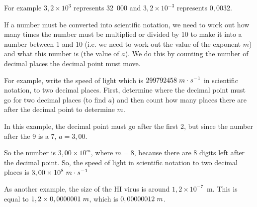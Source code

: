 For example $3,2\ensuremath{\times}{10}^{3}$ represents 32~000 and $3,2\ensuremath{\times}{10}^{-3}$ represents
$0,0032$.\par 
      \label{m38346*id177971}If a number must be converted into scientific notation, we need to work out how
many times the number must be multiplied or divided by 10 to make it into a
number between 1 and 10 (i.e. we need to work out the value of the exponent $m$)
and what this number is (the value of $a$). We do this by counting the number of
decimal places the decimal point must move.\par 
      \label{m38346*id177995}For example, write the speed of light which is $299 792 458\phantom{\rule{3pt}{0ex}}m\ensuremath{\cdot}s{}^{-1}$ in
scientific notation, to two decimal places. First, determine where the decimal
point must go for two decimal places (to find $a$) and then count how many
places there are after the decimal point to determine $m$.\par 
      \label{m38346*id178035}In this example, the decimal point must go after the first 2, but since the
number after the 9 is a 7, $a=3,00$.\par 
      \label{m38346*id178057}So the number is $3,00\ensuremath{\times}{10}^{m}$, where $m=8$, because there are 8 digits
left after the decimal point. So, the speed of light in scientific notation to
two decimal places is $3,00\ensuremath{\times}{10}^{8}\phantom{\rule{3pt}{0ex}}m\ensuremath{\cdot}s{}^{-1}$\par 
      \label{m38346*id178140}As another example, the size of the HI virus is around $1,2\ensuremath{\times}{10}^{-7}$~m.
This is equal to $1,2\ensuremath{\times}0,0000001\phantom{\rule{3pt}{0ex}}m$, which is $0,00000012\phantom{\rule{3pt}{0ex}}m$.\par 
